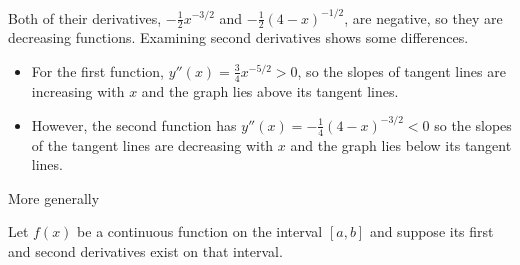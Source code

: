Both of their derivatives, $-\frac{1}{2}x^{-3/2}$ and $-\frac{1}{2}(4-x)^{-1/2}$, are
negative, so they are decreasing functions. Examining second derivatives shows some
differences.
\begin{itemize}
 \item For the first function, $y''(x) = \frac{3}{4}x^{-5/2}>0$, so the slopes of tangent
lines are increasing with $x$ and the graph lies above its tangent lines.
\item However, the second function has $y''(x) = -\frac{1}{4}(4-x)^{-3/2}<0$ so the
slopes of the tangent lines are decreasing with $x$ and the graph lies below its tangent
lines.
\end{itemize}

More generally
\begin{defn}
Let $f(x)$ be a continuous function on the interval $[a,b]$ and suppose its first and
second derivatives exist on that interval.
\begin{itemize}


\end{itemize}
\end{defn}
